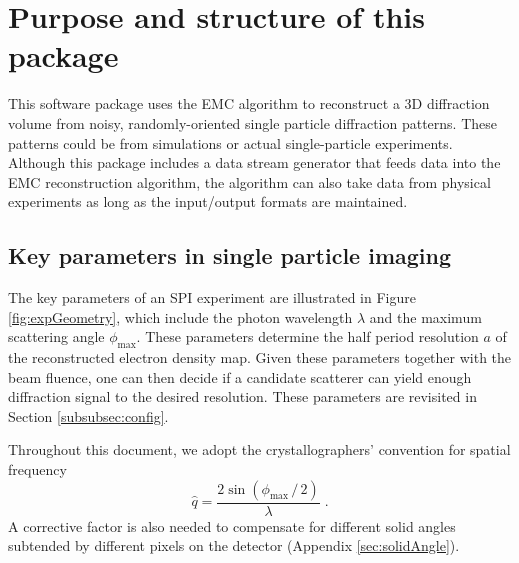 \documentclass[preprint]{iucr}              %
\begin{document}
\section{Purpose and structure of this package}\label{sec:package}

This software package uses the EMC algorithm to reconstruct a 3D diffraction volume from noisy, randomly-oriented single particle diffraction patterns. These patterns could be from simulations or actual single-particle experiments. Although this package includes a data stream generator that feeds data into the EMC reconstruction algorithm, the algorithm can also take data from physical experiments as long as the input/output formats are maintained.

\subsection{Key parameters in single particle imaging}\label{sec:expParams}

The key parameters of an SPI experiment are illustrated in Figure \ref{fig:expGeometry}, which include the photon wavelength $\lambda$ and the maximum scattering angle $\phi_{\text{max}}$. These parameters determine the half period resolution $a$ of the reconstructed electron density map. Given these parameters together with the beam fluence, one can then decide if a candidate scatterer can yield enough diffraction signal to the desired resolution. These parameters are revisited in Section \ref{subsubsec:config}.

Throughout this document, we adopt the crystallographers' convention for spatial frequency 
\begin{equation}
\widehat{q} = \frac{2 \sin(\phi_{\text{max}}\,/\,2)}{\lambda}\;.
\end{equation}
A corrective factor is also needed to compensate for different solid angles subtended by different pixels on the detector (Appendix \ref{sec:solidAngle}). 
\end{document}
